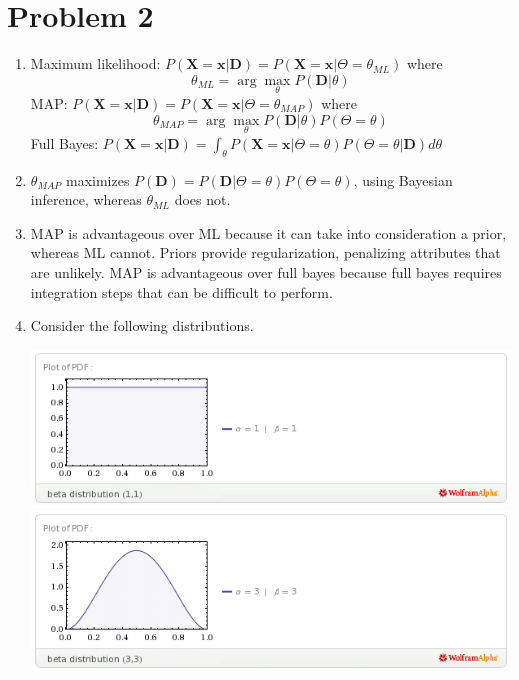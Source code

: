 \documentclass{article}
\begin{document}
\section*{Problem 2}
\begin{enumerate}
\item Maximum likelihood: $P(\mathbf X=\mathbf x | \mathbf D)=P(\mathbf X = \mathbf x | \Theta=\theta_{ML})$
  where $$\theta_{ML} = \arg \max_\theta P(\mathbf D|\theta)$$
  MAP: $P(\mathbf X = \mathbf x | \mathbf D) = P(\mathbf X = \mathbf x | \Theta = \theta_{MAP})$
  where $$\theta_{MAP} = \arg \max_\theta P(\mathbf D | \theta)P(\Theta = \theta)$$
  Full Bayes: $P(\mathbf X = \mathbf x | \mathbf D) = \int_\theta P(\mathbf X = \mathbf x | \Theta = \theta)P(\Theta = \theta | \mathbf D)d\theta$

\item $\theta_{MAP}$ maximizes $P(\mathbf D)=P(\mathbf D | \Theta = \theta)P(\Theta = \theta)$,
  using Bayesian inference, whereas $\theta_{ML}$ does not. 
\item MAP is advantageous over ML because it can take into consideration
  a prior, whereas ML cannot. Priors provide regularization, penalizing
  attributes that are unlikely. 
  MAP is advantageous over full bayes because full bayes requires
  integration steps that can be difficult to perform. 
\item
  Consider the following distributions.
      \begin{center}
        \includegraphics[scale=.5]{beta_1_1.png}
        \includegraphics[scale=.5]{beta_3_3.png}

\end{center}
\end{enumerate}
\end{document}
